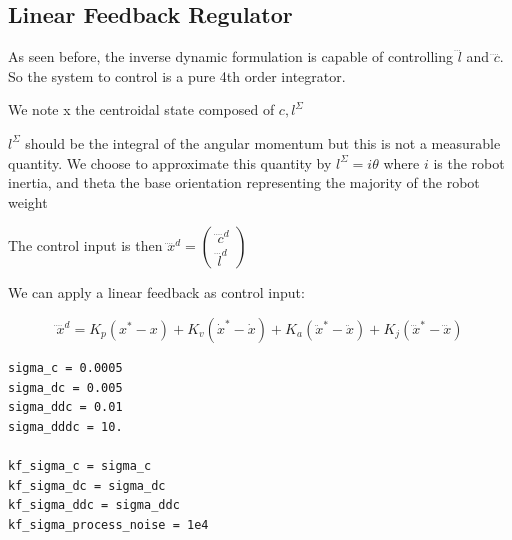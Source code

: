 \documentclass[12pt]{article}
\begin{document}
\subsection*{Linear Feedback Regulator}
As seen before, the inverse dynamic formulation is capable of controlling $\dddot{l}$ and $\ddddot{c}$.
So the system to control is a pure 4th order integrator.

We note x the centroidal state composed of ${c, l^\Sigma}$

$l^\Sigma$ should be the integral of the angular momentum but this is not a measurable quantity. We choose to approximate this quantity by $l^\Sigma = i \theta$ where $i$ is the robot inertia, and theta the base orientation representing the majority of the robot weight

The control input is then $\ddddot{x}^d= \begin{pmatrix}  \ddddot{c}^d \\ \dddot{l}^d \end{pmatrix}$

We can apply a linear feedback as control input:

$$\ddddot{x}^d = K_p(x^* - x) + K_v(\dot{x}^*-\dot{x})+ K_a(\ddot{x}^*-\ddot{x})+K_j(\dddot{x}^*-\dddot{x})$$

\begin{verbatim}
sigma_c = 0.0005 
sigma_dc = 0.005
sigma_ddc = 0.01
sigma_dddc = 10.

kf_sigma_c = sigma_c
kf_sigma_dc = sigma_dc
kf_sigma_ddc = sigma_ddc
kf_sigma_process_noise = 1e4
\end{verbatim}
\end{document}
